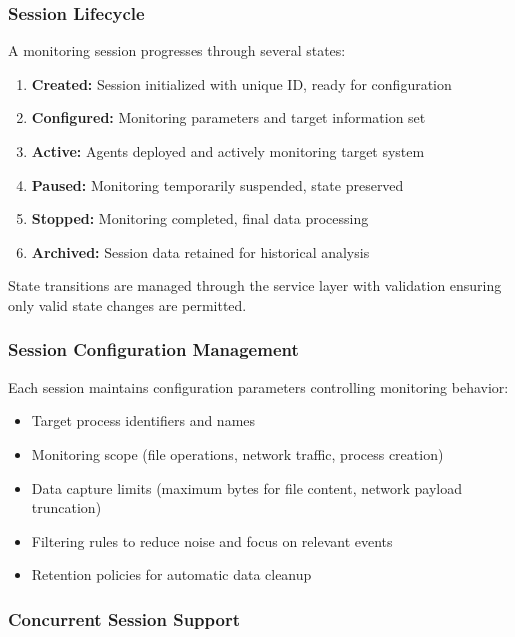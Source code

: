 \subsubsection{Session Lifecycle}

A monitoring session progresses through several states:

\begin{enumerate}
    \item \textbf{Created:} Session initialized with unique ID, ready for configuration
    \item \textbf{Configured:} Monitoring parameters and target information set
    \item \textbf{Active:} Agents deployed and actively monitoring target system
    \item \textbf{Paused:} Monitoring temporarily suspended, state preserved
    \item \textbf{Stopped:} Monitoring completed, final data processing
    \item \textbf{Archived:} Session data retained for historical analysis
\end{enumerate}

State transitions are managed through the service layer with validation ensuring only valid state changes are permitted.

\subsubsection{Session Configuration Management}

Each session maintains configuration parameters controlling monitoring behavior:

\begin{itemize}
    \item Target process identifiers and names
    \item Monitoring scope (file operations, network traffic, process creation)
    \item Data capture limits (maximum bytes for file content, network payload truncation)
    \item Filtering rules to reduce noise and focus on relevant events
    \item Retention policies for automatic data cleanup
\end{itemize}

\subsubsection{Concurrent Session Support}

